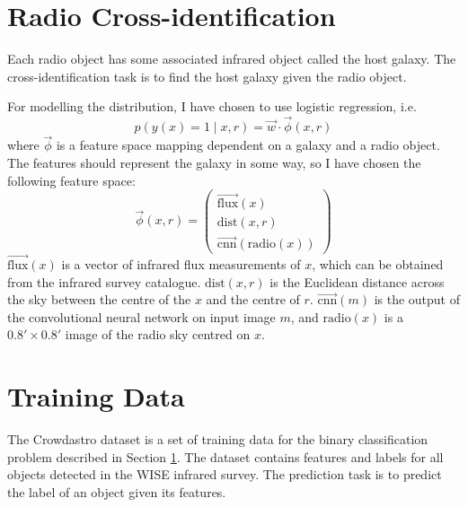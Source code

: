 \section{Radio Cross-identification}
\label{sec:cross-identification}

    Each radio object has some associated infrared object called the host
    galaxy. The cross-identification task is to find the host galaxy given the
    radio object.
    
    For modelling the distribution, I have chosen to use logistic regression,
    i.e.
    \begin{equation}
        \label{eq:logistic-regression-cross-identification}
        p(y(x) = 1 \mid x, r) = \vec w \cdot \vec \phi(x, r)
    \end{equation}
    where $\vec \phi$ is a feature space mapping dependent on a galaxy and a
    radio object. The features should represent the galaxy in some way, so I
    have chosen the following feature space:
    \begin{equation}
        \label{eq:galaxy-features}
        \vec \phi(x, r) = \begin{pmatrix}
            \vec{\mbox{flux}}(x)\\
            \mbox{dist}(x, r)\\
            \vec{\mbox{cnn}}(\mbox{radio}(x))
        \end{pmatrix}
    \end{equation}
    $\vec{\mbox{flux}}(x)$ is a vector of infrared flux measurements of $x$,
    which can be obtained from the infrared survey catalogue. $\mbox{dist}(x,
    r)$ is the Euclidean distance across the sky between the centre of the $x$
    and the centre of $r$. $\vec{\mbox{cnn}}(m)$ is the output of the
    convolutional neural network on input image $m$, and $\mbox{radio}(x)$ is a
    $0.8' \times 0.8'$ image of the radio sky centred on $x$.

\section{Training Data}
\label{sec:training-data}
  
  The Crowdastro dataset is a set of training data for the binary
  classification problem described in Section \ref{sec:cross-identification}.
  The dataset contains features and labels for all objects detected in the WISE
  infrared survey. The prediction task is to predict the label of an object
  given its features.

